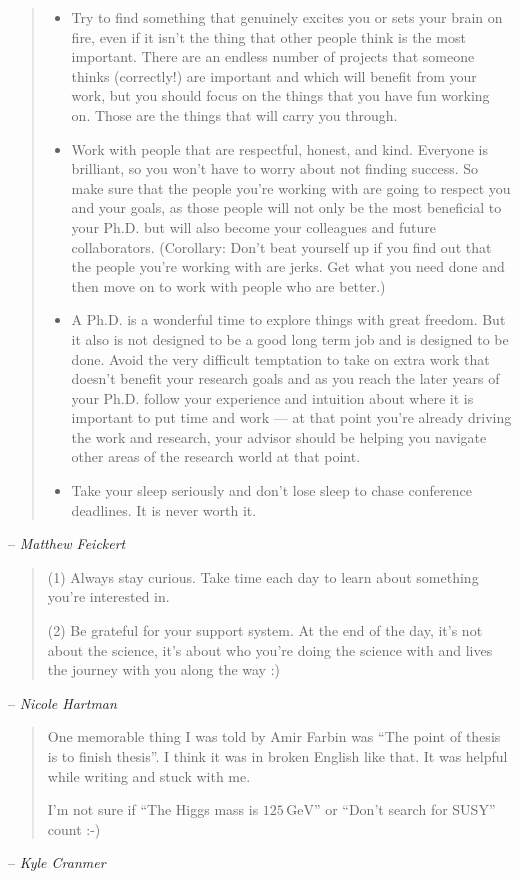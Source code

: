 \documentclass[
  11pt,
  numbers=noendperiod]{book}
\begin{document}
\begin{quote}
    \begin{itemize}
        \item Try to find something that genuinely excites you or sets your brain on fire, even if it isn't the thing that other people think is the most important. There are an endless number of projects that someone thinks (correctly!) are important and which will benefit from your work, but you should focus on the things that you have fun working on. Those are the things that will carry you through.
        \item Work with people that are respectful, honest, and kind. Everyone is brilliant, so you won't have to worry about not finding success. So make sure that the people you're working with are going to respect you and your goals, as those people will not only be the most beneficial to your Ph.D. but will also become your colleagues and future collaborators. (Corollary: Don't beat yourself up if you find out that the people you're working with are jerks. Get what you need done and then move on to work with people who are better.)
        \item A Ph.D. is a wonderful time to explore things with great freedom. But it also is not designed to be a good long term job and is designed to be done. Avoid the very difficult temptation to take on extra work that doesn't benefit your research goals and as you reach the later years of your Ph.D. follow your experience and intuition about where it is important to put time and work --- at that point you're already driving the work and research, your advisor should be helping you navigate other areas of the research world at that point.
        \item Take your sleep seriously and don't lose sleep to chase conference deadlines. It is never worth it. 
    \end{itemize}

\end{quote}
\hfill-- \textit{Matthew Feickert}
\begin{quote}
(1) Always stay curious. Take time each day to learn about something you’re interested in.

(2) Be grateful for your support system. At the end of the day, it’s not about the science, it’s about who you’re doing the science with and lives the journey with you along the way :) 
    
\end{quote}
\hfill-- \textit{Nicole Hartman}
\begin{quote}
    One memorable thing I was told by Amir Farbin was ``The point of thesis is to finish thesis''. I think it was in broken English like that. It was helpful while writing and stuck with me.
    
    I'm not sure if ``The Higgs mass is $125 \,\text{GeV}$'' or ``Don't search for SUSY'' count :-) 
\end{quote}
\hfill-- \textit{Kyle Cranmer}
\end{document}
